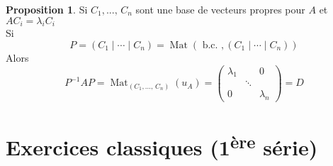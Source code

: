 \documentclass[10pt,a4paper]{article}
\theoremstyle{definition}
\newtheorem{proposition}{Proposition}[section]
\DeclareMathOperator*{\Mat}{Mat}
\begin{document}
\begin{proposition}
Si $C_1, ...,\, C_n$ sont une base de vecteurs propres pour $A$ et $A C_i = \lambda_i C_i$\\
Si 
\[ P = \left(C_1 \mid \cdots \mid C_n \right) = \Mat \left( \text{ b.c. },  (C_1 \mid \cdots \mid C_n) \right) \]
Alors
\[ P^{-1} A P = \Mat_{(C_1, ...,\, C_n)}(u_A) = \begin{pmatrix}
\lambda_1 & & 0 \\
& \ddots & \\
0 & & \lambda_n
\end{pmatrix} = D \]
\end{proposition}

\section{Exercices classiques (1\textsuperscript{ère} série)}
\renewcommand{\labelenumi}{\arabic{enumi}}
\end{document}
